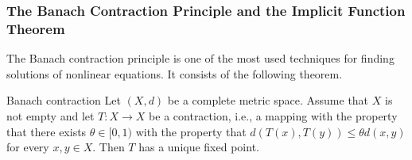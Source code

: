 \subsubsection{The Banach Contraction Principle and the Implicit Function Theorem}\label{subsec:banach-contraction-implicit-function}

The Banach contraction principle is one of the most used techniques for finding solutions of nonlinear equations. It consists of the following theorem.

\begin{Theorem}{Banach contraction}
\label{thm:banach-contraction-fixed-point}
Let $(X,d)$ be a complete metric space. Assume that $X$ is not empty and let $T:X\to X$ be a contraction, i.e., a mapping with the property that there exists $\theta\in[0,1)$ with the property that $d(T(x),T(y))\leq\theta d(x,y)$ for every $x,y\in X$. Then $T$ has a unique fixed point.
\end{Theorem}

\begingroup
\renewcommand{\endProof}{\par\nobreak\hfill$\blacksquare$\par\vspace{0.1cm}}
\endgroup
